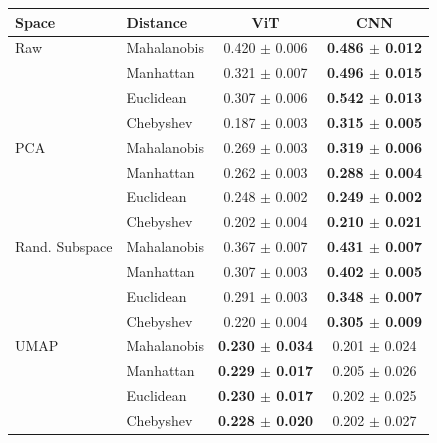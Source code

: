 \begin{tabular}{llcc}
\toprule
Space & Distance & ViT & CNN \\
\midrule
Raw & Mahalanobis & 0.420 $\pm$ 0.006 & \textbf{0.486 $\pm$ 0.012} \\
 & Manhattan & 0.321 $\pm$ 0.007 & \textbf{0.496 $\pm$ 0.015} \\
 & Euclidean & 0.307 $\pm$ 0.006 & \textbf{0.542 $\pm$ 0.013} \\
 & Chebyshev & 0.187 $\pm$ 0.003 & \textbf{0.315 $\pm$ 0.005} \\
\midrule
PCA & Mahalanobis & 0.269 $\pm$ 0.003 & \textbf{0.319 $\pm$ 0.006} \\
 & Manhattan & 0.262 $\pm$ 0.003 & \textbf{0.288 $\pm$ 0.004} \\
 & Euclidean & 0.248 $\pm$ 0.002 & \textbf{0.249 $\pm$ 0.002} \\
 & Chebyshev & 0.202 $\pm$ 0.004 & \textbf{0.210 $\pm$ 0.021} \\
\midrule
Rand. Subspace & Mahalanobis & 0.367 $\pm$ 0.007 & \textbf{0.431 $\pm$ 0.007} \\
 & Manhattan & 0.307 $\pm$ 0.003 & \textbf{0.402 $\pm$ 0.005} \\
 & Euclidean & 0.291 $\pm$ 0.003 & \textbf{0.348 $\pm$ 0.007} \\
 & Chebyshev & 0.220 $\pm$ 0.004 & \textbf{0.305 $\pm$ 0.009} \\
\midrule
UMAP & Mahalanobis & \textbf{0.230 $\pm$ 0.034} & 0.201 $\pm$ 0.024 \\
 & Manhattan & \textbf{0.229 $\pm$ 0.017} & 0.205 $\pm$ 0.026 \\
 & Euclidean & \textbf{0.230 $\pm$ 0.017} & 0.202 $\pm$ 0.025 \\
 & Chebyshev & \textbf{0.228 $\pm$ 0.020} & 0.202 $\pm$ 0.027 \\

\bottomrule
\end{tabular}